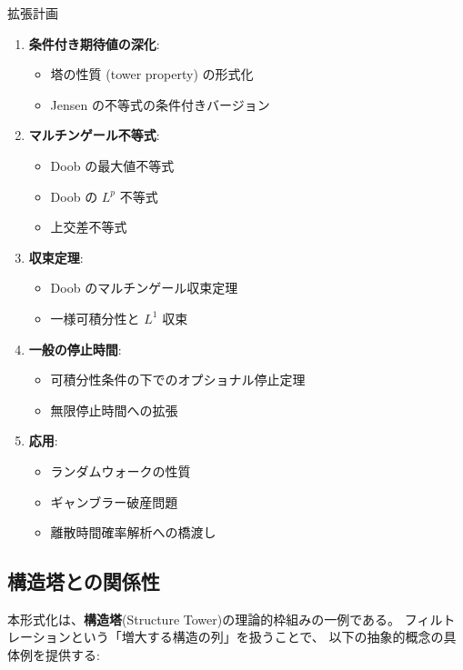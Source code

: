 \documentclass[a4paper,12pt]{ltjsarticle}
\theoremstyle{definition}
\begin{document}
\begin{mainbox}{拡張計画}
\begin{enumerate}
\item \textbf{条件付き期待値の深化}:
  \begin{itemize}
  \item 塔の性質 (tower property) の形式化
  \item Jensen の不等式の条件付きバージョン
  \end{itemize}

\item \textbf{マルチンゲール不等式}:
  \begin{itemize}
  \item Doob の最大値不等式
  \item Doob の $L^p$ 不等式
  \item 上交差不等式
  \end{itemize}

\item \textbf{収束定理}:
  \begin{itemize}
  \item Doob のマルチンゲール収束定理
  \item 一様可積分性と $L^1$ 収束
  \end{itemize}

\item \textbf{一般の停止時間}:
  \begin{itemize}
  \item 可積分性条件の下でのオプショナル停止定理
  \item 無限停止時間への拡張
  \end{itemize}

\item \textbf{応用}:
  \begin{itemize}
  \item ランダムウォークの性質
  \item ギャンブラー破産問題
  \item 離散時間確率解析への橋渡し
  \end{itemize}
\end{enumerate}
\end{mainbox}

\subsection{構造塔との関係性}

本形式化は、\textbf{構造塔}(Structure Tower)の理論的枠組みの一例である。
フィルトレーションという「増大する構造の列」を扱うことで、
以下の抽象的概念の具体例を提供する:
\end{document}
